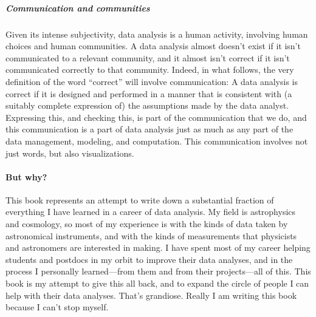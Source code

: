 \subparagraph{Communication and communities}
Given its intense subjectivity, data analysis is a human activity, involving human choices and human communities.
A data analysis almost doesn't exist if it isn't communicated to a relevant community, and it almost isn't correct if it isn't communicated correctly to that community.
Indeed, in what follows, the very definition of the word ``correct'' will involve communication:
A data analysis is correct if it is designed and performed in a manner that is consistent with (a suitably complete expression of) the assumptions made by the data analyst.
Expressing this, and checking this, is part of the communication that we do, and this communication is a part of data analysis just as much as any part of the data management, modeling, and computation.
This communication involves not just words, but also visualizations.

\paragraph{But why?}
This book represents an attempt to write down a substantial fraction of everything I have learned in a career of data analysis.
My field is astrophysics and cosmology, so most of my experience is with the kinds of data taken by astronomical instruments, and with the kinds of measurements that physicists and astronomers are interested in making.
I have spent most of my career helping students and postdocs in my orbit to improve their data analyses, and in the process I personally learned---from them and from their projects---all of this.
This book is my attempt to give this all back, and to expand the circle of people I can help with their data analyses.
That's grandiose.
Really I am writing this book because I can't stop myself.
